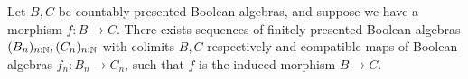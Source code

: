 \begin{lemma}\label{lemDecompositionOfColimitMorphisms}
  Let $B,C$ be countably presented Boolean algebras, 
  and suppose we have a morphism $f:B\to C$.
  There exists sequences of finitely presented Boolean algebras 
  $(B_n)_{n:\mathbb{N}}, (C_n)_{n:\mathbb{N}}$ with colimits $B,C$ respectively
  and compatible maps of Boolean algebras $f_n:B_n \to C_n$, 
  such that $f$ is the induced morphism $B\to C$.
\end{lemma}
